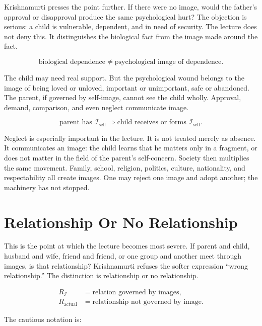 \documentclass[11pt,oneside]{book}
\begin{document}
Krishnamurti presses the point further. If there were no image, would the father's approval or disapproval produce the same psychological hurt? The objection is serious: a child is vulnerable, dependent, and in need of security. The lecture does not deny this. It distinguishes the biological fact from the image made around the fact.

\begin{equation}
\text{biological dependence}
\neq
\text{psychological image of dependence}.
\end{equation}

The child may need real support. But the psychological wound belongs to the image of being loved or unloved, important or unimportant, safe or abandoned. The parent, if governed by self-image, cannot see the child wholly. Approval, demand, comparison, and even neglect communicate image.

\begin{equation}
\text{parent has }\mathcal{I}_{\text{self}}
\Longrightarrow
\text{child receives or forms }\mathcal{I}_{\text{self}}.
\end{equation}

Neglect is especially important in the lecture. It is not treated merely as absence. It communicates an image: the child learns that he matters only in a fragment, or does not matter in the field of the parent's self-concern. Society then multiplies the same movement. Family, school, religion, politics, culture, nationality, and respectability all create images. One may reject one image and adopt another; the machinery has not stopped.

\section{Relationship Or No Relationship}

This is the point at which the lecture becomes most severe. If parent and child, husband and wife, friend and friend, or one group and another meet through images, is that relationship? Krishnamurti refuses the softer expression ``wrong relationship.'' The distinction is relationship or no relationship.

\begin{align}
R_{\mathcal{I}} &= \text{relation governed by images},\\
R_{\text{actual}} &= \text{relationship not governed by image}.
\end{align}

The cautious notation is:
\end{document}
